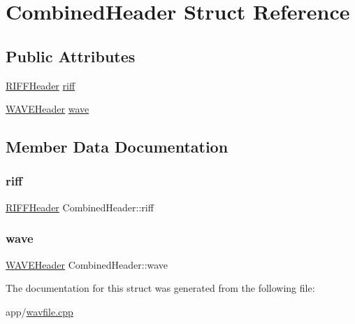 \hypertarget{struct_combined_header}{}\section{Combined\+Header Struct Reference}
\label{struct_combined_header}
\subsection*{Public Attributes}
\begin{DoxyCompactItemize}
\item 
\hyperlink{struct_r_i_f_f_header}{R\+I\+F\+F\+Header} \hyperlink{struct_combined_header_ad31d827b36c88f885c9a0a4616414056}{riff}
\item 
\hyperlink{struct_w_a_v_e_header}{W\+A\+V\+E\+Header} \hyperlink{struct_combined_header_aa74e3cc8011eac683c9b1ae366a6cc6a}{wave}
\end{DoxyCompactItemize}


\subsection{Member Data Documentation}
\hypertarget{struct_combined_header_ad31d827b36c88f885c9a0a4616414056}{}\label{struct_combined_header_ad31d827b36c88f885c9a0a4616414056} 
\subsubsection{\texorpdfstring{riff}{riff}}
{\footnotesize\ttfamily \hyperlink{struct_r_i_f_f_header}{R\+I\+F\+F\+Header} Combined\+Header\+::riff}

\hypertarget{struct_combined_header_aa74e3cc8011eac683c9b1ae366a6cc6a}{}\label{struct_combined_header_aa74e3cc8011eac683c9b1ae366a6cc6a} 
\subsubsection{\texorpdfstring{wave}{wave}}
{\footnotesize\ttfamily \hyperlink{struct_w_a_v_e_header}{W\+A\+V\+E\+Header} Combined\+Header\+::wave}



The documentation for this struct was generated from the following file\+:\begin{DoxyCompactItemize}
\item 
app/\hyperlink{wavfile_8cpp}{wavfile.\+cpp}\end{DoxyCompactItemize}
